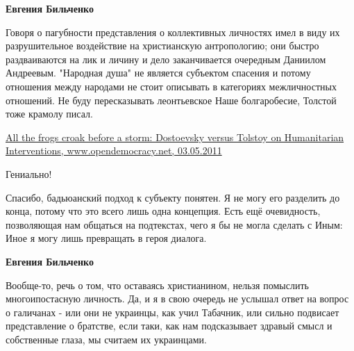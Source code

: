 \begin{itemize}
\begin{itemize}
\textbf{Евгения Бильченко} 

Говоря о пагубности представления о коллективных личностях имел в виду их
разрушительное воздействие на христианскую антропологию; они быстро
раздваиваются на лик и личину и дело заканчивается очередным Даниилом
Андреевым. "Народная душа" не является субъектом спасения и потому отношения
между народами не стоит описывать в категориях межличностных отношений. Не буду
пересказывать леонтьевское Наше болгаробесие, Толстой тоже крамолу писал.

\href{https://www.opendemocracy.net/en/all-frogs-croak-before-storm-dostoevsky-versus-tolstoy-on-humanitarian-interventions/}{%
All the frogs croak before a storm: Dostoevsky versus Tolstoy on Humanitarian Interventions, %
www.opendemocracy.net, 03.05.2011%
%
}

 
Гениально!

 

Спасибо, бадьюанский подход к субъекту понятен. Я не могу его разделить до
конца, потому что это всего лишь одна концепция. Есть ещё очевидность,
позволяющая нам общаться на подтекстах, чего я бы не могла сделать с Иным: Иное
я могу лишь превращать в героя диалога.


 
\textbf{Евгения Бильченко} 

Вообще-то, речь о том, что оставаясь христианином, нельзя помыслить
многоипостасную личность. Да, и я в свою очередь не услышал ответ на вопрос о
галичанах - или они не украинцы, как учил Табачник, или сильно подвисает
представление о братстве, если таки, как нам подсказывает здравый смысл и
собственные глаза, мы считаем их украинцами.

 

\end{itemize}
\end{itemize}
